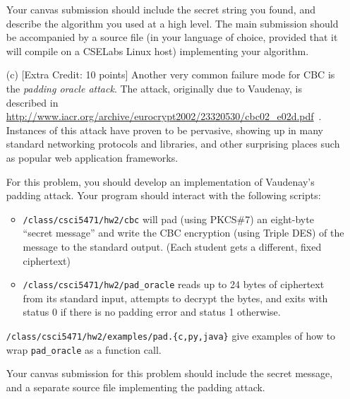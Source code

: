 \documentclass[11pt]{article}
\begin{document}
\begin{itemize}
  Your canvas submission should include the secret string you found,
  and describe the algorithm you used at a high level.  The main
  submission should be accompanied by a source file (in your language
  of choice, provided that it will compile on a CSELabs Linux host)
  implementing your algorithm.

\item[(c)] [Extra Credit: 10 points] Another very common failure mode
  for CBC is the {\em padding oracle attack}.  The attack, originally
  due to Vaudenay, is described in
  \url{http://www.iacr.org/archive/eurocrypt2002/23320530/cbc02_e02d.pdf}~.
  Instances of this attack have proven to be pervasive, showing up in many
  standard networking protocols and libraries, and other surprising
  places such as popular web application frameworks.

  For this problem, you should develop an implementation of Vaudenay's
  padding attack.  Your program should interact with the following scripts:
  \begin{itemize}
  \item \verb#/class/csci5471/hw2/cbc# will pad (using PKCS\#7) an eight-byte
    ``secret message'' and write the CBC encryption (using Triple
    DES) of the message to the standard output.  (Each student gets
    a different, fixed ciphertext)
    
  \item \verb#/class/csci5471/hw2/pad_oracle# reads up to 24 bytes
    of ciphertext from its standard input, attempts to decrypt the
    bytes, and exits with status 0 if there is no padding error and
    status 1 otherwise.
  \end{itemize}
  \verb#/class/csci5471/hw2/examples/pad.{c,py,java}# give examples of how to
  wrap \verb#pad_oracle# as a function call.
  
  Your canvas submission for this problem should include the secret
  message, and a separate source file implementing the padding attack.
\end{itemize}
\end{document}
